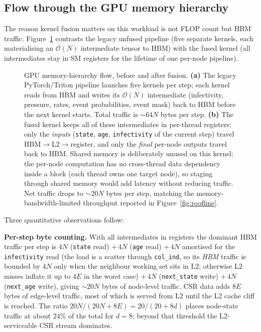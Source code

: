 \documentclass[a4paper,fleqn]{cas-sc}
\theoremstyle{definition}
\theoremstyle{remark}
\newcommand{\bigO}{\mathcal{O}}
\begin{document}
\subsection{Flow through the GPU memory hierarchy}
\label{app:memory_flow}

The reason kernel fusion matters on this workload is not FLOP count but HBM traffic. Figure~\ref{fig:memory_flow} contrasts the legacy unfused pipeline (five separate kernels, each materialising an $\bigO(N)$ intermediate tensor to HBM) with the fused kernel (all intermediates stay in SM registers for the lifetime of one per-node pipeline).

\begin{figure}[htbp]
\centering

\caption{GPU memory-hierarchy flow, before and after fusion. \textbf{(a)} The legacy PyTorch/Triton pipeline launches five kernels per step; each kernel reads from HBM and writes its $\bigO(N)$ intermediate (infectivity, pressure, rates, event probabilities, event mask) back to HBM before the next kernel starts. Total traffic is $\sim$64$N$ bytes per step. \textbf{(b)} The fused kernel keeps all of these intermediates in per-thread registers; only the \emph{inputs} (\texttt{state}, \texttt{age}, \texttt{infectivity} of the current step) travel HBM$\to$L2$\to$register, and only the \emph{final} per-node outputs travel back to HBM. Shared memory is deliberately unused on this kernel: the per-node computation has no cross-thread data dependency inside a block (each thread owns one target node), so staging through shared memory would add latency without reducing traffic. Net traffic drops to $\sim$20$N$ bytes per step, matching the memory-bandwidth-limited throughput reported in Figure~\ref{fig:roofline}.}
\label{fig:memory_flow}
\end{figure}

Three quantitative observations follow:

\textbf{Per-step byte counting.} With all intermediates in registers the dominant HBM traffic per step is $4N$ (\texttt{state} read) $+\,4N$ (\texttt{age} read) $+\,4N$ amortised for the \texttt{infectivity} read (the load is a scatter through \texttt{col\_ind}, so its \emph{HBM} traffic is bounded by $4N$ only when the neighbour working set sits in L2; otherwise L2 misses inflate it up to $4E$ in the worst case) $+\,4N$ (\texttt{next\_state} write) $+\,4N$ (\texttt{next\_age} write), giving $\sim$$20N$ bytes of node-level traffic. CSR data adds $8E$ bytes of edge-level traffic, most of which is served from L2 until the L2 cache cliff is reached. The ratio $20N / (20N + 8E) = 20 / (20 + 8d)$ places node-state traffic at about $24\%$ of the total for $d = 8$; beyond that threshold the L2-serviceable CSR stream dominates.
\end{document}
